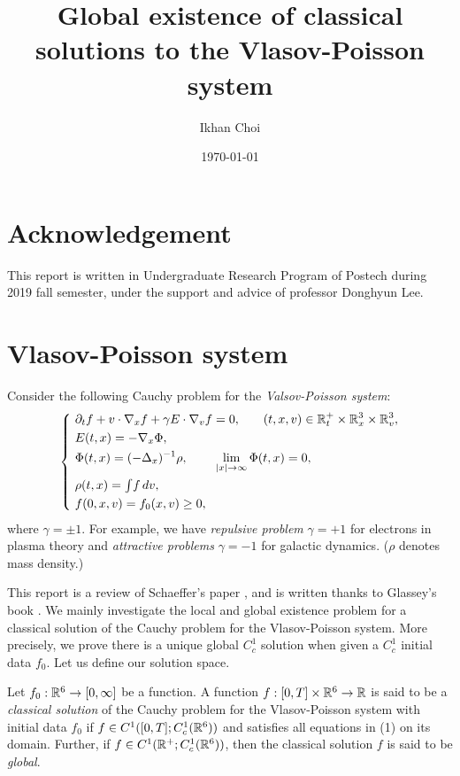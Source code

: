 \documentclass[11pt]{amsart}
\title{Global existence of classical solutions to the Vlasov-Poisson system}
\author{Ikhan Choi}
\date{\today}
\begin{document}
\maketitle
\tableofcontents

\section*{Acknowledgement}
This report is written in Undergraduate Research Program of Postech during 2019 fall semester, under the support and advice of professor Donghyun Lee.

\section{Vlasov-Poisson system}
Consider the following Cauchy problem for the \emph{Valsov-Poisson system}:
\begin{align}
\left\{\ \begin{alignedat}{2}
&\pd_tf+v\cdot\del_xf+\gamma E\cdot\del_vf=0,&&\qquad(t,x,v)\in\R_t^+\x\R_x^3\x\R_v^3,\\
&E(t,x)=-\del_x\Phi,\\
&\Phi(t,x)=(-\Delta_x)^{-1}\rho,&&\hspace{-2em}\lim_{|x|\to\infty}\Phi(t,x)=0,\\
&\rho(t,x)=\tint f\,dv,\\
&f(0,x,v)=f_0(x,v)\ge0,
\end{alignedat}\right.
\end{align}
where $\gamma=\pm1$.
For example, we have \emph{repulsive problem} $\gamma=+1$ for electrons in plasma theory and \emph{attractive problems} $\gamma=-1$ for galactic dynamics.
($\rho$ denotes mass density.)

This report is a review of Schaeffer's paper \cite{schaeffer1991global}, and is written thanks to Glassey's book \cite{glassey1996cauchy}.
We mainly investigate the local and global existence problem for a classical solution of the Cauchy problem for the Vlasov-Poisson system.
More precisely, we prove there is a unique global $C_c^1$ solution when given a $C_c^1$ initial data $f_0$.
Let us define our solution space.

\begin{defn*}
Let $f_0:\mathbb{R}^6\to[0,\infty]$ be a function.
A function $f:[0,T]\times\mathbb{R}^6\to\mathbb{R}$ is said to be a \emph{classical solution} of the Cauchy problem for the Vlasov-Poisson system with initial data $f_0$ if $f\in C^1([0,T];C_c^1(\mathbb{R}^6))$ and satisfies all equations in (1) on its domain.
Further, if $f\in C^1(\mathbb{R}^+;C_c^1(\mathbb{R}^6))$, then the classical solution $f$ is said to be \emph{global}.
\end{defn*}
\end{document}
